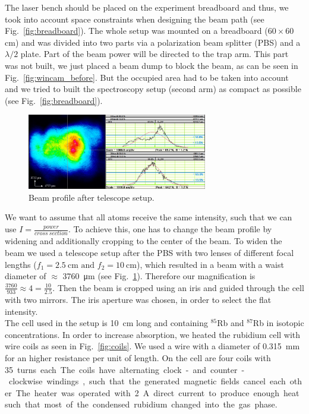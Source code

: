 The laser bench should be placed on the experiment breadboard and thus, we took
into account space constraints when designing the beam path (see Fig.~\ref{fig:breadboard}).
The whole setup was mounted on a breadboard (\(60 \times 60 \)\si{\centi\meter}) 
and was divided into two parts via a polarization beam splitter (PBS) and a 
\(\lambda/2\) plate. Part of the beam power will be directed to the trap arm. 
This part was not built, we just placed a beam dump to block the beam, as can be 
seen in Fig.~\ref{fig:wincam_before}. But the occupied area had to be taken into 
account and we tried to built the spectroscopy setup (second arm) as compact as 
possible (see Fig.~\ref{fig:breadboard}).

\begin{figure}[H]
    \centering
    \includegraphics[width=0.7\textwidth]{beam_widened} 
    \caption{\label{fig:beam_widened} Beam profile after telescope setup.}
\end{figure}

We want to assume that all atoms receive the same intensity, such that we can 
use \(I = \frac{power}{cross~section} \). To achieve this, one has to change the 
beam profile by widening and additionally cropping to the center of the beam. 
To widen the beam we used a telescope setup after the PBS
with two lenses of different focal lengths (\(f_1 = \SI{2.5}{\centi\meter} 
\text{ and } f_2 = \SI{10}{\centi\meter}\)), which resulted in a beam with a waist
diameter of \(\approx \) \SI{3760}{\micro\meter} (see Fig.~\ref{fig:beam_widened}).
Therefore our magnification is \(\frac{3760}{933} \approx 4 = \frac{10}{2.5}\). 
Then the beam is cropped using an iris and guided through the cell with two 
mirrors. The iris aperture was chosen, in order to select the flat intensity.\\
The cell used in the setup is \SI{10}{\centi\meter} long and containing \(^{85}\)Rb
and \(^{87}\)Rb in isotopic concentrations. In order to increase absorption, we 
heated the rubidium cell with wire coils as seen in Fig.~\ref{fig:coils}. 
We used a wire with a diameter of \SI{0.315}{\milli\meter} for an higher resistance 
per unit of length. On the cell are four coils with \SI{35} turns each. The coils 
have alternating clock- and counter-clockwise windings, such that the generated 
magnetic fields cancel each other. The heater was operated with \SI{2}{\ampere} 
direct current to produce enough heat such that most of the condensed rubidium 
changed into the gas phase.

